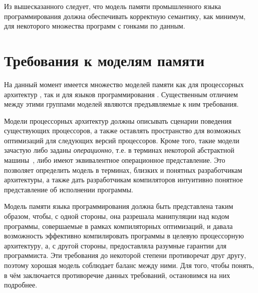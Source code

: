 Из вышесказанного следует, что модель памяти промышленного языка программирования должна обеспечивать корректную семантику,
как минимум, для некоторого множества программ с гонками по данным.

\section{Требования к моделям памяти}
На данный момент имеется множество моделей памяти как для процессорных архитектур
\cite{Sewell-al:CACM10,Alglave-al:TOPLAS14,Flur-al:POPL16,Pulte-al:POPL18,Sarkar-al:PLDI11,Kavanagh-Brookes:CoRR17},
так и для языков программирования
\cite{Crary-Sullivan:POPL15,Lamport:TC79,Boudol-al:EXPRESS12,Boudol-Petri:POPL09,PichonPharabod-Sewell:POPL16,Jeffrey-Riely:LICS16,
Nienhuis-al:OOPSLA16,Batty-al:POPL11,Manson-al:POPL05}.
Существенным отличием между этими группами моделей являются предъявляемые к ним требования.

Модели процессорных архитектур должны описывать сценарии поведения существующих процессоров, а также оставлять пространство
для возможных оптимизаций для следующих версий процессоров.
Кроме того, такие модели зачастую либо заданы \emph{операционно}, т.е. в терминах некоторой
абстрактной машины~\cite{Diehl-al:FGCS00}, либо имеют эквивалентное операционное представление.
Это позволяет определить модель в терминах, близких и понятных разработчикам архитектуры,
а также дать разработчикам компиляторов интуитивно понятное представление
об исполнении программы.

Модель памяти языка программирования должна быть представлена таким образом, чтобы, с одной стороны,
она разрешала манипуляции над кодом программы, совершаемые в рамках компиляторных оптимизаций, и давала возможность
эффективно компилировать программы в целевую процессорную архитектуру, а, с другой стороны, предоставляла
разумные гарантии для программиста.
Эти требования до некоторой степени противоречат друг другу, поэтому хорошая модель
соблюдает баланс между ними.
Для того, чтобы понять, в чём заключается противоречие данных требований, остановимся на них подробнее.

